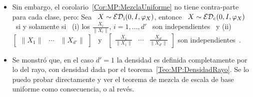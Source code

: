 \begin{itemize}
\begin{itemize}
    se puede calcula la Jacobiana  de la transformaci\'on $X \mapsto (U,\Delta)$
    parametrizando \ $U$ \ con \  $\frac{d (d-1)}{2}$ \ parametros (debido a los
    v\'inculos dados por $U U^t =  I$) a adici\'on a los autovalores. Se muestra
    que  el determinente  de la  Jacobiana  se separa  en un  t\'ermino con  los
    autovalores  \   $\lambda_i$  \  (m\'as  precisamente  en   $\prod_{i  <  j}
    (\lambda_i-\lambda_j)$) por una funci\'on de los par\'ametros parametrizando
    \           $U$          (ver~\cite[\S~3.1]{Meh04},~\cite[\S~6.5          \&
    Ec.~(6.13)]{LivNov18},~\cite[Teo.~17.3]{TemCal13},~\cite[\S~9.3]{Car83}
    o~\cite[\S~8, p.~34-35]{Gir96}).  Con el hecho  de que la  distribuci\'on de
    $X$ depende  solamente de $\lambda =  \diag(\Lambda)$, eso prueba  que $U$ y
    $\Delta$ son independientes. A continuaci\'on, de $X = U \Delta U^t \egald O
    U \Delta (O  U)^t$ se nota que la distribuci\'on de  los autovectores de $X$
    es  invariante  por  transformaci\'on  ortogonal: por  definici\'on,  es  la
    distribuci\'on   de  Haar   sobre   \  $\Ort_d(\Rset)$   (medida  de   Haar,
    normalizada),    \ie   \   $U    \sim   \U\left(    \Ort_d(\Rset)   \right)$
    (ver~\cite[\S~4.6]{EdeRao05},~\cite[Cor.~2.5.4]{AndGui10}       o~\cite[\S~2,
    p.~30]{Gir96}).
  \end{itemize}
  En  los cuatro  primeros  casos, para  $d'  = 1$,  se  recupera obviamente  el
  teorema~~\ref{Teo:MP:MezclaUniforme}.
%
\item   Sin   embargo,   el   corolario~\ref{Cor:MP:MezclaUniforme}   no   tiene
  contra-parte para  cada clase, pero:  Sea \ $X  \sim \mathcal{ED}_{\mathrm{i}}(0,I,\varphi_X)$,
  entonce  \ $X\sim  \mathcal{ED}_{\mathrm{c}}(0,I,\varphi_X)$  \ si  y  solamente si  \ (i)  los
  $\frac{X_i}{\| X_i \|}, \, i = 1, \ldots , d'$ \ son independientes \ y (ii) \
  $\begin{bmatrix}  \| X_1  \| &  \cdots &  \| X_{d'}  \| \end{bmatrix}$  \  y \
  $\begin{bmatrix}  \frac{X_1}{\| X_1  \|}  & \cdots  & \frac{X_{d'}}{\|  X_{d'}
      \|} \end{bmatrix}$ son independientes~\cite[Lema~6]{FanChe84}.
%
\item  Se  monstr\'o  que,  en  el  caso  $d'  =  1$  la  densidad  es  definida
  completamente    por   lo    del   rayo,    con   densidad    dada    por   el
  teorema~\ref{Teo:MP:DensidadRayo}. Se  lo puedo  probar directamente y  ver el
  teorema de mezcla de escala de  base uniforme como consecuencia, o al rev\'es.

\end{itemize}
